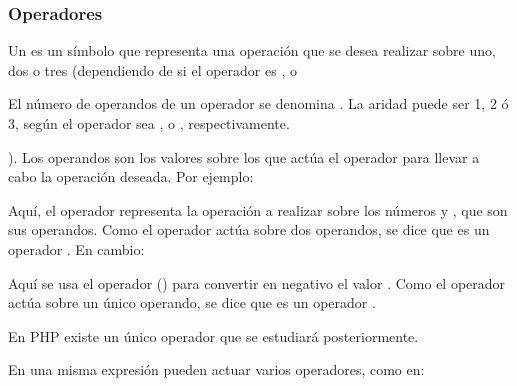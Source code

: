 \documentclass[a4paper,12pt,spanish]{sphinxmanual}
\begin{document}
\ignorespaces 

\subsubsection{Operadores}
\label{\detokenize{php:index-8}}\label{\detokenize{php:operadores}}
Un  es un símbolo que representa una operación que se desea realizar
sobre uno, dos o tres  (dependiendo de si el operador es ,
 o  %
\begin{footnote}[2]\sphinxAtStartFootnote
El número de operandos de un operador se denomina . La aridad
puede ser 1, 2 ó 3, según el operador sea ,  o
, respectivamente.
%
\end{footnote}). Los operandos son los valores sobre los que
actúa el operador para llevar a cabo la operación deseada. Por ejemplo:

\begin{sphinxVerbatim}[commandchars=\\\{\}]
  
\end{sphinxVerbatim}

Aquí, el operador \sphinxcode{+} representa la operación  a realizar sobre los
números  y , que son sus operandos. Como el operador actúa sobre dos
operandos, se dice que es un operador . En cambio:

\begin{sphinxVerbatim}[commandchars=\\\{\}]
\end{sphinxVerbatim}

Aquí se usa el operador \sphinxcode{-} () para convertir en negativo el
valor . Como el operador actúa sobre un único operando, se dice que es un
operador .

En PHP existe un único operador  que se estudiará posteriormente.

En una misma expresión pueden actuar varios operadores, como en:

\begin{sphinxVerbatim}[commandchars=\\\{\}]
    
\end{sphinxVerbatim}
\end{document}
